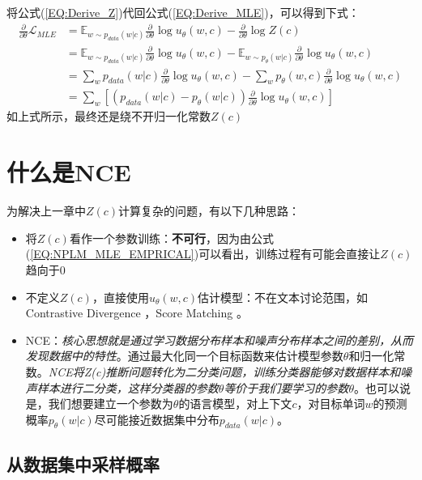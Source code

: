 \documentclass{article}
\begin{document}
将公式(\ref{EQ:Derive_Z})代回公式(\ref{EQ:Derive_MLE})，可以得到下式：
\begin{equation}
    \begin{split}
        \frac{\partial}{\partial \theta} \mathcal{L}_{MLE} &= \mathbb{E}_{w \sim p_{data}(w|c)} \frac{\partial}{\partial \theta} \log u_\theta(w,c) - \frac{\partial}{\partial \theta} \log Z(c) \\
        &= \mathbb{E}_{w \sim p_{data}(w|c)} \frac{\partial}{\partial \theta} \log u_\theta(w,c) - \mathbb{E}_{w \sim p_\theta(w|c)} \frac{\partial}{\partial \theta} \log u_\theta(w,c)\\
        &= \sum_{w} p_{data}(w|c) \frac{\partial}{\partial \theta} \log u_\theta (w,c) - \sum_{w} p_\theta (w,c)\frac{\partial}{\partial \theta} \log u_\theta (w,c) \\
        &= \sum_{w}[(p_{data}(w|c)-p_\theta(w|c))\frac{\partial}{\partial \theta} \log u_\theta (w,c)]
    \end{split}
    \label{EQ:NPLM_MLE_DERIVE}
\end{equation}
如上式所示，最终还是绕不开归一化常数$Z(c)$

\section{什么是NCE}
\label{sec:NCE}
为解决上一章中$Z(c)$计算复杂的问题，有以下几种思路：
\begin{itemize}
    \item 将$Z(c)$看作一个参数训练：\textbf{不可行}，因为由公式(\ref{EQ:NPLM_MLE_EMPRICAL})可以看出，训练过程有可能会直接让$Z(c)$趋向于0
    \item 不定义$Z(c)$，直接使用$u_\theta(w,c)$估计模型：不在文本讨论范围，如 Contrastive Divergence \cite{DBLP:journals/neco/Hinton02}，Score Matching \cite{DBLP:journals/jmlr/Hyvarinen05}。
    \item NCE：\emph{核心思想就是通过学习数据分布样本和噪声分布样本之间的差别，从而发现数据中的特性}。通过最大化同一个目标函数来估计模型参数$\theta$和归一化常数。\emph{NCE将Z(c)推断问题转化为二分类问题，训练分类器能够对数据样本和噪声样本进行二分类，这样分类器的参数$\theta$等价于我们要学习的参数$\theta$}。也可以说是，我们想要建立一个参数为$\theta$的语言模型，对上下文$c$，对目标单词$w$的预测概率$p_{\theta}(w|c)$尽可能接近数据集中分布$p_{data}(w|c)$。
\end{itemize}

\subsection{从数据集中采样概率}
\end{document}

